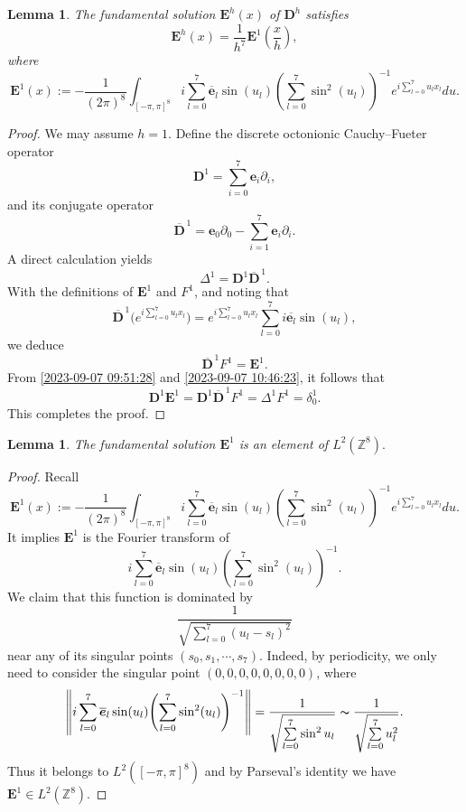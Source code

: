 \documentclass{amsart}
\newtheorem{lemma}[theorem]{Lemma}
\theoremstyle{definition}
\theoremstyle{remark}
\numberwithin{equation}{section}
\newcommand{\p}{\partial}
\newcommand{\Z}{\mathbb Z}
\newcommand{\e}{\bm{e}}
\newcommand{\E}{\bm{E}}
\begin{document}
    \begin{lemma}\label{2023-09-07 22:03:59}
        The fundamental solution $\E^h(x)$ of $\bm D^h$ satisfies   \[
\E^h (x)= \frac{1}{h^7}\E^1(\frac{x}{h}),
\] where  \begin{equation}
            \label{2023-09-07 10:25:17}
            \E^1(x):= - \frac{1}{(2\pi)^8}\int_{[-\pi,\pi]^8} i\sum\limits_{l=0}^7  \bm {\overline   e}_l \sin (u_l)   {\left(\sum\limits_{l=0}^7 \sin^2(u_l)\right)^{-1}} e^{i\sum\limits_{l=0}^7 u_lx_l}  du.
        \end{equation}
    \end{lemma}
    \begin{proof}
     We may assume $h=1.$ Define the discrete octonionic Cauchy--Fueter operator
\[
\bm D^1 = \sum\limits_{i=0}^7 \e_i\p_i,
\]
and its conjugate operator
\[
\bm{\overline D}^{\,1}=\e_0\p_0-\sum\limits_{i=1}^7 \e_i\p_i.
\]
A direct calculation yields
\begin{equation}
        \label{2023-09-07 10:46:23}
        \Delta^1=\bm D^1 \bm{\overline D}^{\,1}.
       \end{equation}
With the definitions of $\E^1$ and $F^1$, and noting that
\[
\bm {\overline D}^{\,1} \Big(e^{i\sum\limits_{l=0}^7 u_lx_l}\Big)= e^{i\sum\limits_{l=0}^7 u_lx_l } \sum\limits_{l=0}^7 i \overline{\e_l} \sin (u_l),
\]
we deduce
\begin{equation}
        \label{2023-09-17 09:11:52}
        \bm {\overline D}^{\,1} F^1= \E^1.
       \end{equation}
From \eqref{2023-09-07 09:51:28} and \eqref{2023-09-07 10:46:23}, it follows that
\[
\bm D^1 \E^1=\bm D^1 \bm{\overline D}^{\,1} F^1=\Delta^1 F^1=\delta_0^1.
\]
This completes the proof.
    \end{proof}

    \begin{lemma}\label{2023-09-11 19:51:11}
    The fundamental solution $\E^1$ is an element of  $L^2(\Z^8).$
\end{lemma}
\begin{proof}
    Recall
    \[
\E^1(x):= - \frac{1}{(2\pi)^8}\int_{[-\pi,\pi]^8} i\sum\limits_{l=0}^7  \bm {\overline   e}_l \sin (u_l)   {\left(\sum\limits_{l=0}^7 \sin^2(u_l)\right)^{-1}} e^{i\sum\limits_{l=0}^7 u_lx_l}  du.
\]
It implies    $\E^1$ is the Fourier transform of
    \[
i\sum\limits_{l=0}^7  \bm {\overline   e}_l \sin (u_l)   {\left(\sum\limits_{l=0}^7 \sin^2(u_l)\right)^{-1}}.
\]
    We claim that this function is dominated by \[
\frac{1}{\sqrt{\sum\limits_{l=0}^7(u_l-s_l)^2}}
\]
    near any of its singular points $(s_0,s_1,\cdots,s_7).$
      Indeed, by periodicity, we only need to consider the singular point $(0,0,0,0,0,0,0,0)$, where
   \begin{equation*}
       \left \Vert i\sum\limits_{l=0}^7  \bm {\overline   e}_l \sin (u_l)   {\left(\sum\limits_{l=0}^7 \sin^2(u_l)\right)^{-1}} \right\Vert =\frac{1}{\sqrt{\sum\limits_{l=0}^7 \sin^2u_l}}   \thicksim \frac{1}{\sqrt{\sum\limits_{l=0}^7 u_l^2}}.
    \end{equation*}
   Thus it belongs to $L^2([-\pi,\pi]^8)$ and by Parseval's identity we have $\E^1 \in L^2(\Z^8).$
\end{proof}
\end{document}
